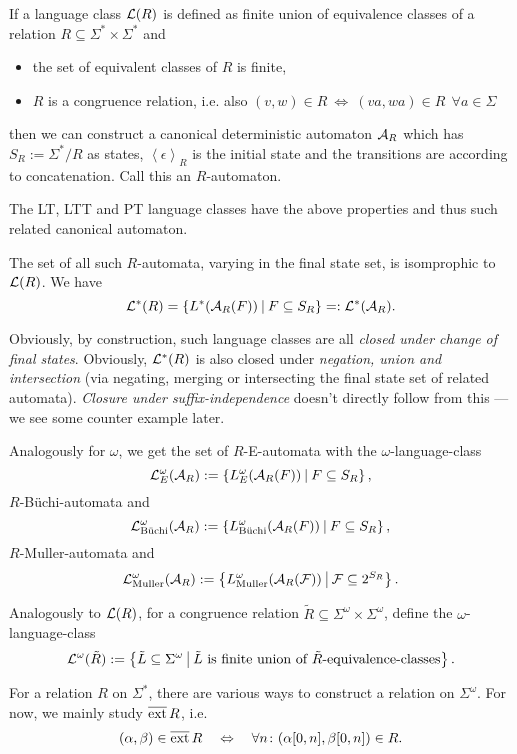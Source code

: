 If a language class $\mathcal{L}(R)$ is defined as finite union of equivalence classes of a relation $R \subseteq \Sigma^* \times \Sigma^*$ and
\begin{itemize}
\item the set of equivalent classes of $R$ is finite,
\item $R$ is a congruence relation, i.e. also $(v,w) \in R \ \Leftrightarrow \ (va,wa) \in R \ \ \forall a \in \Sigma$
\end{itemize}
then we can construct a canonical deterministic automaton $\mathcal{A}_R$ which has $S_R := \Sigma^* / R$ as states, $\left<\epsilon\right>_R$ is the initial state and the transitions are according to concatenation. Call this an $R$-automaton.

The LT, LTT and PT language classes have the above properties and thus such related canonical automaton.

The set of all such $R$-automata, varying in the final state set, is isomprophic to $\mathcal{L}(R)$. We have
\[ \Lang^*(R) = \Set{L^*(\A_R(F))}{F \subseteq S_R} =: \Lang^*(\A_R) . \]

Obviously, by construction, such language classes are all \emph{closed under change of final states}. Obviously, $\mathcal{L}^*(R)$ is also closed under \emph{negation, union and intersection} (via negating, merging or intersecting the final state set of related automata). \emph{Closure under suffix-independence} doesn't directly follow from this --- we see some counter example later.

\begin{mydef}
Analogously for $\omega$, we get the set of $R$-E-automata with the $\omega$-language-class
\[ \Lang^\omega_E(\A_R) := \Set{L^\omega_E(\A_R(F))}{F \subseteq S_R} , \]
$R$-Büchi-automata and
\[ \Lang^\omega_{\text{Büchi}} (\A_R) := \Set{L^\omega_\text{Büchi}(\A_R(F))}{F \subseteq S_R} , \]
$R$-Muller-automata and
\[ \Lang^\omega_{\text{Muller}} (\A_R) := \Set{L^\omega_\text{Muller}(\A_R(\F))}{\F \subseteq 2^{S_R}} . \]
\end{mydef}

\begin{mydef}
Analogously to $\mathcal{L}(R)$, for a congruence relation $\tilde R \subseteq \Sigma^\omega \times \Sigma^\omega$, define the $\omega$-language-class
\[ \Lang^\omega(\tilde R) := \Set{\tilde L \subseteq \Sigma^\omega}{\text{$\tilde L$ is finite union of $\tilde R$-equivalence-classes}} . \]
\end{mydef}

For a relation $R$ on $\Sigma^*$, there are various ways to construct a relation on $\Sigma^\omega$. For now, we mainly study $\operatorname{\overline{ext}} R$, i.e.
\[ (\alpha,\beta) \in \dext R \ \ \ \Leftrightarrow \ \ \ \forall n \colon (\alpha[0,n],\beta[0,n]) \in R . \]

